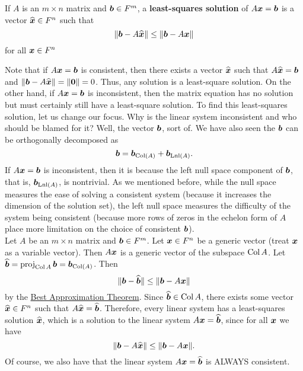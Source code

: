 \begin{Def} If $A$ is an $m\times n$ matrix and $\boldsymbol b\in F^m$, a \textbf{least-squares solution} of $A\boldsymbol x = \boldsymbol b$ is a vector $\widehat{\boldsymbol x}\in F^n$ such that 
\[\Vert \boldsymbol b - A\widehat{\boldsymbol x}\Vert \le \Vert \boldsymbol b - A\boldsymbol x\Vert\] for all $\boldsymbol x \in F^n$
\end{Def}\vs

Note that if $A\boldsymbol x = \boldsymbol b$ is consistent, then there exists a vector $\widehat{\boldsymbol x}$ such that $A\widehat{\boldsymbol x} = \boldsymbol b$ and $\Vert \boldsymbol b - A\widehat{\boldsymbol x}\Vert = \Vert \boldsymbol 0 \Vert = 0$. Thus, any solution is a least-square solution. On the other hand, if $A\boldsymbol x = \boldsymbol b$ is inconsistent, then the matrix equation has no solution but must certainly still have a least-square solution. To find this least-squares solution, let us change our focus. Why is the linear system inconsistent and who should be blamed for it? Well, the vector $\boldsymbol b$, sort of. We have also seen the $\boldsymbol b$ can be orthogonally decomposed as 
\[\boldsymbol b = \boldsymbol b_{\operatorname{Col}(A)} + \boldsymbol b_{\operatorname*{Lnl}(A)}.\] If $A\boldsymbol x=\boldsymbol b$ is inconsistent, then it is because the left null space component of $\boldsymbol b$, that is, $\boldsymbol b_{\operatorname*{Lnl}(A)}$, is nontrivial. As we mentioned before, while the null space measures the ease of solving a consistent system (because it increases the dimension of the solution set), the left null space measures the difficulty of the system being consistent (because more rows of zeros in the echelon form of $A$ place more limitation on the choice of consistent $\boldsymbol b$).\\

Let $A$ be an $m\times n$ matrix and $\boldsymbol b\in F^m$. Let $\boldsymbol x\in F^n$ be a generic vector (treat $\boldsymbol x$ as a variable vector). Then $A\boldsymbol x$ is a generic vector of the subspace $\operatorname{Col} A$.  Let $\widehat{\boldsymbol b} = \operatorname{proj}_{\operatorname{Col} A}\boldsymbol b = \boldsymbol b_{\operatorname{Col}(A)}$. Then 
\[\Vert \boldsymbol b - \widehat{\boldsymbol b}\Vert \le \Vert \boldsymbol b - A\boldsymbol x\Vert\] by the \hyperref[thm:bestapprox]{Best Approximation Theorem}. Since $\widehat{\boldsymbol b}\in \operatorname{Col} A$, there exists some vector $\widehat{\boldsymbol x}\in F^n$ such that $A\widehat{\boldsymbol x} = \widehat{\boldsymbol b}$. Therefore, every linear system has a least-squares solution $\widehat{\boldsymbol x}$, which is a solution to the linear system $A\boldsymbol x = \widehat{\boldsymbol b}$, since for all $\boldsymbol x$ we have \[\Vert \boldsymbol b - A\widehat{\boldsymbol x}\Vert \le \Vert \boldsymbol b - A\boldsymbol x\Vert.\] Of course, we also have that the linear system $A\boldsymbol x = \widehat{\boldsymbol b}$ is ALWAYS consistent.\\

